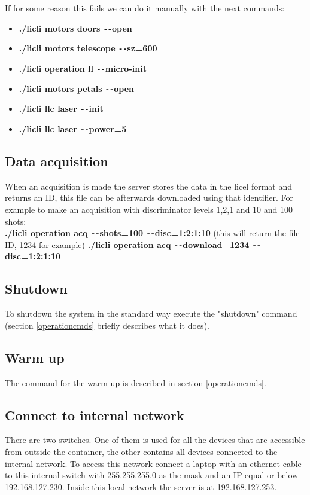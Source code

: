 \documentclass[letterpaper, 10 pt]{article}
\begin{document}
If for some reason this fails we can do it manually with the next commands:
\begin{itemize}
	\item \textbf{./licli motors doors \texttt{-{}-}open}
	\item \textbf{./licli motors telescope \texttt{-{}-}sz=600}
	\item \textbf{./licli operation ll  \texttt{-{}-}micro-init}
	\item \textbf{./licli motors petals \texttt{-{}-}open}
	\item \textbf{./licli llc laser \texttt{-{}-}init}
	\item  \textbf{./licli llc laser \texttt{-{}-}power=5}
\end{itemize}
\subsection{Data acquisition}
When an acquisition is made the server stores the data in the licel format and returns an ID, this file can be afterwards downloaded using that identifier. For example to make an acquisition with discriminator levels 1,2,1 and 10 and 100 shots:\\
\textbf{./licli operation acq \texttt{-{}-}shots=100 \texttt{-{}-}disc=1:2:1:10}  (this will return the file ID, 1234 for example)
\textbf{./licli operation acq \texttt{-{}-}download=1234 \texttt{-{}-}disc=1:2:1:10}
\subsection{Shutdown}
To shutdown the system in the standard way execute the "shutdown" command (section \ref{operationcmds} briefly describes what it does). \\

\subsection{Warm up}
The command for the warm up is described in section \ref{operationcmds}.

\subsection{Connect to internal network}
There are two switches. One of them is used for all the devices that are accessible from outside the container, the other contains all devices connected to the internal network. To access this network connect a laptop with an ethernet cable to this internal switch with 255.255.255.0 as the mask and an IP equal or below 192.168.127.230. Inside this local network the server is at 192.168.127.253.
\end{document}
